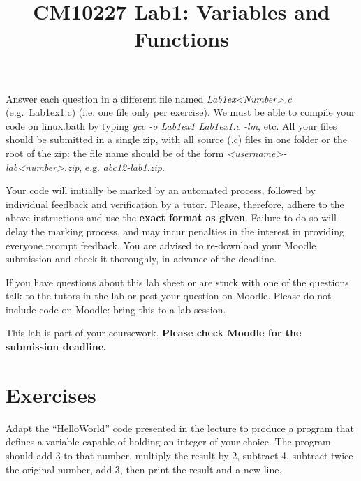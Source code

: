 \documentclass[12pt, a4paper, oneside]{article}
\author{}
\date{}
\title{CM10227 Lab1: Variables and Functions}
\newcounter{qstncntr}
\newcommand{\exerset}{ \vspace*{-11pt}\setcounter{qstncntr}{0} }
\newenvironment{exer}[1]{\vspace*{11pt}\noindent {{\bf Exercise} \stepcounter{qstncntr} \theqstncntr:} #1}{}
\begin{document}
\maketitle

Answer each question in a different file named \emph{Lab1ex<Number>.c }(e.g.\ Lab1ex1.c) (i.e. one file only per exercise).
We must be able to compile your code on \href{http://www.bath.ac.uk/guides/connecting-to-linux-bath/}{linux.bath} by typing \emph{gcc -o Lab1ex1 Lab1ex1.c -lm}, etc.
All your files should be submitted in a single zip, with all source (.c) files in one folder or the root of the zip:
the file name should be of the form \emph{<username>-lab<number>.zip}, e.g. \emph{abc12-lab1.zip}.

Your code will initially be marked by an automated process, followed by individual feedback and verification by a tutor.
Please, therefore, adhere to the above instructions and use the \textbf{exact format as given}.
Failure to do so will delay the marking process, and may incur penalties in the interest in providing everyone prompt feedback.
You are advised to re-download your Moodle submission and check it thoroughly, in advance of the deadline.

If you have questions about this lab sheet or are stuck with one of the questions talk to the tutors in the lab or post your question on Moodle.
Please do not include code on Moodle: bring this to a lab session.

This lab is part of your coursework.
\textbf{Please check Moodle for the submission deadline.}

\section*{Exercises}
\setlength{\parindent}{0cm} %
\exerset
\begin{exer}
  Adapt the ``HelloWorld'' code presented in the lecture to produce a program that defines a variable capable of holding an integer of your choice. The program should add 3 to that number, multiply the result by 2, subtract 4, subtract twice the original number, add 3, then print the result and a new line.
\end{exer}
\end{document}
